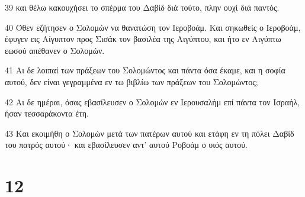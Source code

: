 \par 39 και θέλω κακουχήσει το σπέρμα του Δαβίδ διά τούτο, πλην ουχί διά παντός.
\par 40 Όθεν εζήτησεν ο Σολομών να θανατώση τον Ιεροβοάμ. Και σηκωθείς ο Ιεροβοάμ, έφυγεν εις Αίγυπτον προς Σισάκ τον βασιλέα της Αιγύπτου, και ήτο εν Αιγύπτω εωσού απέθανεν ο Σολομών.
\par 41 Αι δε λοιπαί των πράξεων του Σολομώντος και πάντα όσα έκαμε, και η σοφία αυτού, δεν είναι γεγραμμένα εν τω βιβλίω των πράξεων του Σολομώντος;
\par 42 Αι δε ημέραι, όσας εβασίλευσεν ο Σολομών εν Ιερουσαλήμ επί πάντα τον Ισραήλ, ήσαν τεσσαράκοντα έτη.
\par 43 Και εκοιμήθη ο Σολομών μετά των πατέρων αυτού και ετάφη εν τη πόλει Δαβίδ του πατρός αυτού· και εβασίλευσεν αντ' αυτού Ροβοάμ ο υιός αυτού.

\chapter{12}


